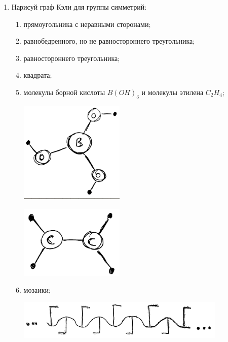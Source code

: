 \documentclass[12pt]{article} %
\begin{document}
\begin{enumerate}[resume]
\item  Нарисуй граф Кэли для группы симметрий:
\begin{enumerate}
  \item прямоугольника с неравными сторонами;
  \item равнобедренного, но не равностороннего треугольника;
  \item равностороннего треугольника;
  \item квадрата;
  \item молекулы борной кислоты $B(OH)_3$ и молекулы этилена $C_2H_4$;


   \begin{minipage}[c]{0.5\textwidth}
   \centering
           \includegraphics[width=5cm]{figure/boric_acidb.png}
   \end{minipage}
   \begin{minipage}[c]{0.5\textwidth}
   \centering
           \includegraphics[width=5cm]{figure/ethylene.png}
   \end{minipage}


  \item мозаики;


  \begin{minipage}[c]{\textwidth}
  \centering
          \includegraphics[width=10cm]{figure/mosaic_a.png}
  \end{minipage}



\end{enumerate}
\end{enumerate}
\end{document}
